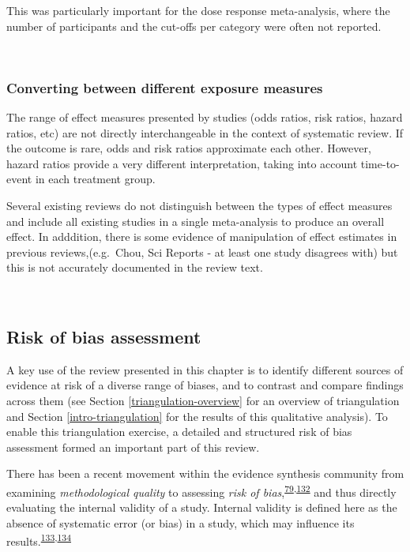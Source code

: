 \documentclass[a4paper, twoside]{templates/ociamthesis}
\begin{document}
This was particularly important for the dose response meta-analysis, where the number of participants and the cut-offs per category were often not reported.

~

\hypertarget{converting-between-different-exposure-measures}{%
\subsubsection{Converting between different exposure measures}\label{converting-between-different-exposure-measures}}

The range of effect measures presented by studies (odds ratios, risk ratios, hazard ratios, etc) are not directly interchangeable in the context of systematic review. If the outcome is rare, odds and risk ratios approximate each other. However, hazard ratios provide a very different interpretation, taking into account time-to-event in each treatment group.

Several existing reviews do not distinguish between the types of effect measures and include all existing studies in a single meta-analysis to produce an overall effect. In adddition, there is some evidence of manipulation of effect estimates in previous reviews,(e.g.~Chou, Sci Reports - at least one study disagrees with) but this is not accurately documented in the review text.

~

\hypertarget{risk-of-bias}{%
\subsection{Risk of bias assessment}\label{risk-of-bias}}

A key use of the review presented in this chapter is to identify different sources of evidence at risk of a diverse range of biases, and to contrast and compare findings across them (see Section \ref{triangulation-overview} for an overview of triangulation and Section \ref{intro-triangulation} for the results of this qualitative analysis). To enable this triangulation exercise, a detailed and structured risk of bias assessment formed an important part of this review.

There has been a recent movement within the evidence synthesis community from examining \emph{methodological quality} to assessing \emph{risk of bias},\textsuperscript{\protect\hyperlink{ref-mcguinness2018}{79},\protect\hyperlink{ref-sterne2016}{132}} and thus directly evaluating the internal validity of a study. Internal validity is defined here as the absence of systematic error (or bias) in a study, which may influence its results.\textsuperscript{\protect\hyperlink{ref-campbell1957}{133},\protect\hyperlink{ref-juni2001}{134}}
\end{document}
